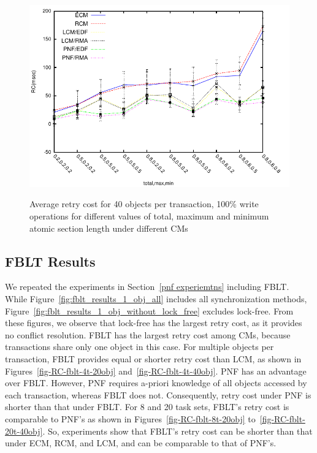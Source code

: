\documentclass[a4paper,english]{article}
\begin{document}
\begin{figure}[!htpd]
{\includegraphics[scale=0.7]
{figures/Abr_dur_20t_420obj_100wr}
\label{fig:20t_ecm_rcm_lcm_pnf_420obj_100wr}
}
\caption{Average retry cost for 40 objects per transaction, 100\% write operations for different values of total, maximum and minimum atomic section length under different CMs}
\label{fig:cm_40obj_per_tx_100wr}
\end{figure}

\subsection{FBLT Results}
\label{fblt experiemnt sec}

We repeated the experiments in Section~\ref{pnf experiemtns} including FBLT. While Figure~\ref{fig:fblt_results_1_obj_all} includes all synchronization methods, Figure~\ref{fig:fblt_results_1_obj_without_lock_free} excludes lock-free. From these figures, we observe that lock-free has the largest retry cost, as it provides no conflict resolution. FBLT has the largest retry cost among CMs,  because transactions share only one object in this case. For multiple objects per transaction, FBLT provides equal or shorter retry cost than LCM, as shown in Figures~\ref{fig-RC-fblt-4t-20obj} and~\ref{fig-RC-fblt-4t-40obj}. PNF has an advantage over FBLT. However, PNF requires a-priori knowledge of all objects accessed by each transaction, whereas FBLT does not. Consequently, retry cost under PNF is shorter than that under FBLT. For 8 and 20 task sets, FBLT's retry cost is comparable to PNF's as shown in Figures~\ref{fig-RC-fblt-8t-20obj} to~\ref{fig-RC-fblt-20t-40obj}. So, experiments show that FBLT's retry cost can be shorter than that under ECM, RCM, and LCM, and can be comparable to that of PNF's.
\end{document}
